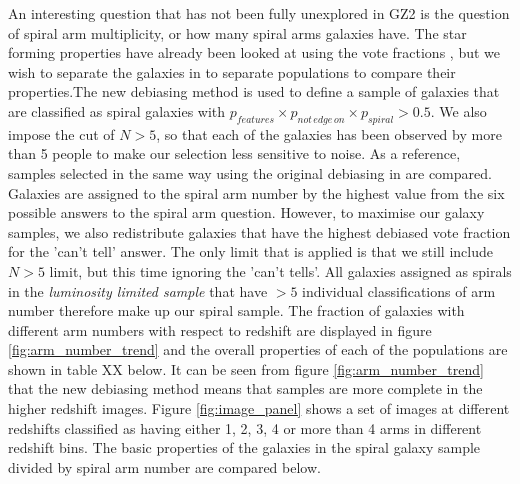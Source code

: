 \documentclass[useAMS,usenatbib]{mn2e}
\begin{document}
An interesting question that has not been fully unexplored in GZ2 is the question of spiral arm multiplicity, or how many spiral arms galaxies have. The star forming properties have already been looked at using the vote fractions \citep{Willett_15}, but we wish to separate the galaxies in to separate populations to compare their properties.The new debiasing method is used to define a sample of galaxies that are classified as spiral galaxies with $p_{features} \times p_{not \, edge \, on} \times p_{spiral} > 0.5$. We also impose the cut of $N>5$, so that each of the galaxies has been observed by more than 5 people to make our selection less sensitive to noise. As a reference, samples selected in the same way using the original debiasing in \citet{Willett_13} are compared. Galaxies are assigned to the spiral arm number by the highest value from the six possible answers to the spiral arm question. However, to maximise our galaxy samples, we also redistribute galaxies that have the highest debiased vote fraction for the 'can't tell' answer. The only limit that is applied is that we still include $N>5$ limit, but this time ignoring the 'can't tells'. All galaxies assigned as spirals in the \textit{luminosity limited sample} that have $>5$ individual classifications of arm number therefore make up our spiral sample. The fraction of galaxies with different arm numbers with respect to redshift are displayed in figure \ref{fig:arm_number_trend} and the overall properties of each of the populations are shown in table XX below. It can be seen from figure \ref{fig:arm_number_trend} that the new debiasing method means that samples are more complete in the higher redshift images. Figure \ref{fig:image_panel} shows a set of images at different redshifts classified as having either 1, 2, 3, 4 or more than 4 arms in different redshift bins. The basic properties of the galaxies in the spiral galaxy sample divided by spiral arm number are compared below.
\end{document}

